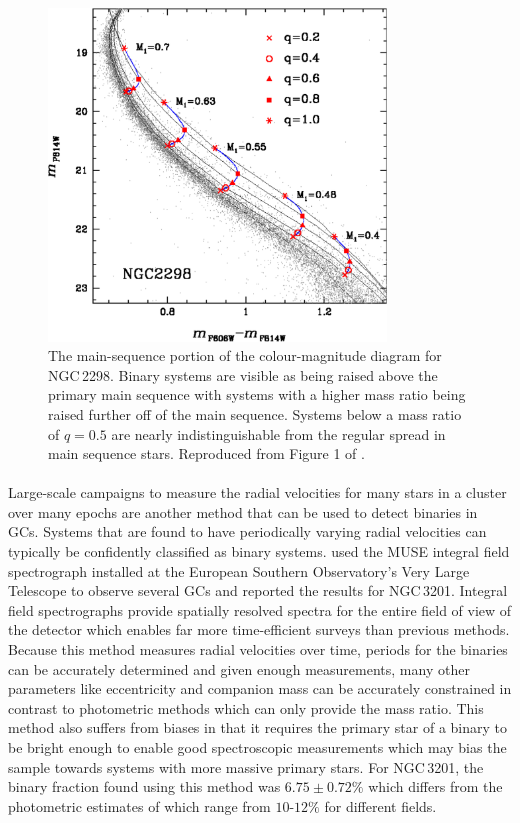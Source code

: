 \begin{figure}
	\centering
	\includegraphics[width=0.8\textwidth]{./figures/main_sequence_binaries.pdf}
	\caption{The main-sequence portion of the colour-magnitude diagram for NGC\,2298. Binary
		systems are visible as being raised above the primary main sequence with systems
		with a higher mass ratio being raised further off of the main sequence. Systems
		below a mass ratio of $q=0.5$ are nearly indistinguishable from the regular spread
		in main sequence stars. Reproduced from Figure 1 of \citet{Milone2012}.}
	\label{fig:1/main_sequence_binaries}
\end{figure}

\paragraph{}
Large-scale campaigns to measure the radial velocities for many stars in a cluster over many epochs
are another method that can be used to detect binaries in GCs. Systems that are found to have
periodically varying radial velocities can typically be confidently classified as binary systems.
\citet{Giesers2019} used the MUSE integral field spectrograph installed at the European Southern
Observatory's Very Large Telescope to observe several GCs and reported the results for NGC\,3201.
Integral field spectrographs provide spatially resolved spectra for the entire field of view of the
detector which enables far more time-efficient surveys than previous methods. Because this method
measures radial velocities over time, periods for the binaries can be accurately determined and
given enough measurements, many other parameters like eccentricity and companion mass can be
accurately constrained in contrast to photometric methods which can only provide the mass ratio.
This method also suffers from biases in that it requires the primary star of a binary to be bright
enough to enable good spectroscopic measurements which may bias the sample towards systems with more
massive primary stars. For NGC\,3201, the binary fraction found using this method was $6.75 \pm 0.72
\%$ \citep{Giesers2019} which differs from the photometric estimates of \citet{Milone2012} which
range from $10\textrm{-}12\%$ for different fields.


